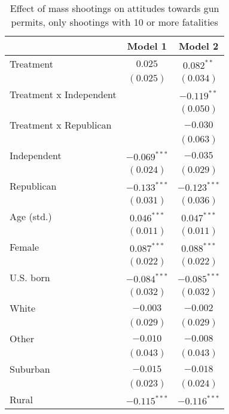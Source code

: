 
\begin{table}
\caption{Effect of mass shootings on attitudes towards gun permits, only shootings with 10 or more fatalities}
\begin{center}
\begin{tabular}{l c c}
\toprule
 & Model 1 & Model 2 \\
\midrule
Treatment               & $0.025$        & $0.082^{**}$   \\
                        & $(0.025)$      & $(0.034)$      \\
Treatment x Independent &                & $-0.119^{**}$  \\
                        &                & $(0.050)$      \\
Treatment x Republican  &                & $-0.030$       \\
                        &                & $(0.063)$      \\
Independent             & $-0.069^{***}$ & $-0.035$       \\
                        & $(0.024)$      & $(0.029)$      \\
Republican              & $-0.133^{***}$ & $-0.123^{***}$ \\
                        & $(0.031)$      & $(0.036)$      \\
Age (std.)              & $0.046^{***}$  & $0.047^{***}$  \\
                        & $(0.011)$      & $(0.011)$      \\
Female                  & $0.087^{***}$  & $0.088^{***}$  \\
                        & $(0.022)$      & $(0.022)$      \\
U.S. born               & $-0.084^{***}$ & $-0.085^{***}$ \\
                        & $(0.032)$      & $(0.032)$      \\
White                   & $-0.003$       & $-0.002$       \\
                        & $(0.029)$      & $(0.029)$      \\
Other                   & $-0.010$       & $-0.008$       \\
                        & $(0.043)$      & $(0.043)$      \\
Suburban                & $-0.015$       & $-0.018$       \\
                        & $(0.023)$      & $(0.024)$      \\
Rural                   & $-0.115^{***}$ & $-0.116^{***}$ \\

\end{tabular}
\end{center}
\end{table}
